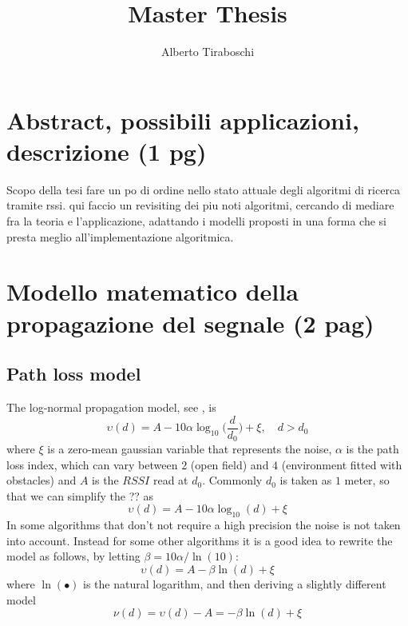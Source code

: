 \documentclass[12pt,twoside]{report}
\title{Master Thesis}
\author{Alberto Tiraboschi}
\begin{document}

\maketitle
\clearpage
\thispagestyle{empty}
\tableofcontents
\thispagestyle{empty}
\clearpage

\setcounter{page}{1}

\chapter{Abstract, possibili applicazioni, descrizione (1 pg)}
Scopo della tesi fare un po di ordine nello stato attuale degli algoritmi di ricerca tramite rssi. qui faccio un revisiting dei piu noti algoritmi, cercando di mediare fra la teoria e l'applicazione, adattando i modelli proposti in una forma che si presta meglio all'implementazione algoritmica.
\clearpage

\chapter{Modello matematico della propagazione del segnale (2 pag)}
\section{Path loss model}
The log-normal propagation model, see \cite{MUNOZ200923}, is
\begin{equation}
\upsilon(d) = A-10\alpha\log_{10}\bigg(\frac{d}{d_0}\bigg) + \xi, \quad d>d_0
\end{equation}
where $\xi$ is a zero-mean gaussian variable that represents the noise, $\alpha$ is the path loss index, which can vary between $2$ (open field) and $4$ (environment fitted with obstacles) and $A$ is the $RSSI$ read at $d_0$. Commonly $d_0$ is taken as $1$ meter, so that we can simplify the ?? as
\begin{equation}
\upsilon(d) = A-10\alpha\log_{10}(d) + \xi   
\end{equation}
In some algorithms that don't not require a high precision the noise is not taken into account. Instead for some other algorithms it is a good idea to rewrite the model as follows, by letting $\beta=10\alpha/\ln(10)$:
\begin{equation}
\upsilon(d) = A-\beta\ln(d) + \xi
\end{equation} where $\ln(\bullet)$ is the natural logarithm, and then deriving a slightly different model
\begin{equation}
\nu(d) = \upsilon(d)-A= -\beta\ln(d) + \xi
\end{equation}
\clearpage
\end{document}
